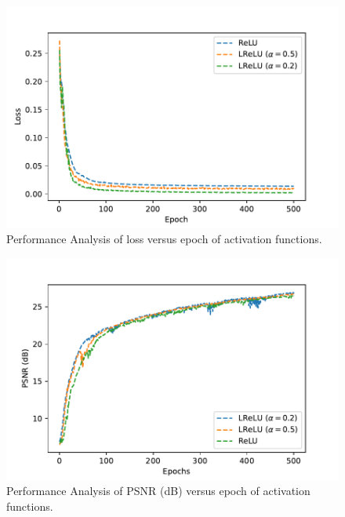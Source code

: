 \documentclass{ieeeaccess}
\begin{document}
\begin{figure}[ht]
  \includegraphics[width=\linewidth]{18FIGURE.pdf}
  \caption{Performance Analysis of loss versus epoch of activation functions.}
  \label{fig:17}
\end{figure}


\begin{figure}[ht]
  \includegraphics[width=\linewidth]{19FIGURE.pdf}
  \caption{Performance Analysis of PSNR (dB) versus epoch of activation functions.}
  \label{fig:17}
\end{figure}
\end{document}
